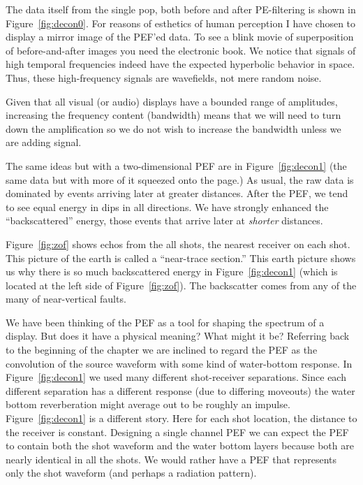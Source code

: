 \par
The data itself from the single pop,
both before and after PE-filtering is shown in
Figure~\ref{fig:decon0}.
For reasons of esthetics of human perception
I have chosen to display a mirror image of the PEF'ed data.
To see a blink movie of superposition of
before-and-after images you need the electronic book.
We notice that signals of high temporal frequencies
indeed have the expected hyperbolic behavior in space.
Thus, these high-frequency signals are wavefields, not mere random noise.


\par
Given that all visual (or audio) displays have a bounded range
of amplitudes, increasing the frequency content (bandwidth)
means that we will need to turn down the amplification
so we do not wish to increase the bandwidth unless we are adding signal.

\par
{}

\par
The same ideas but with a two-dimensional PEF are in
Figure~\ref{fig:decon1} (the same data but with more of
it squeezed onto the page.)
As usual,
the raw data is dominated by events arriving later at greater distances.
After the PEF, we tend to see equal energy in dips in all directions.
We have strongly enhanced the ``backscattered'' energy,
those events that arrive later at {\it shorter} distances.

\par
Figure~\ref{fig:zof} shows
echos from the all shots, the nearest receiver on each shot.
This picture of the earth is called a ``near-trace section.''
This earth picture shows us why there is so much backscattered energy in
Figure~\ref{fig:decon1} (which is located at the left side of
Figure~\ref{fig:zof}).
The backscatter comes from any of the many of near-vertical faults.
\par
We have been thinking of the PEF as a tool
for shaping the spectrum of a display.
But does it have a physical meaning?
What might it be?
Referring back to the beginning of the chapter we are inclined to
regard the PEF as the convolution of the source waveform with
some kind of water-bottom response.
In Figure~\ref{fig:decon1} we used many different shot-receiver
separations.  Since each different separation has a different
response (due to differing moveouts) the water bottom reverberation
might average out to be roughly an impulse.
Figure~\ref{fig:decon1} is a different story.
Here for each shot location, the distance to the receiver is constant.
Designing a single channel PEF we can expect the PEF to contain
both the shot waveform and the water bottom layers because
both are nearly identical in all the shots.
We would rather have a PEF that represents only the shot waveform
(and perhaps a radiation pattern).

